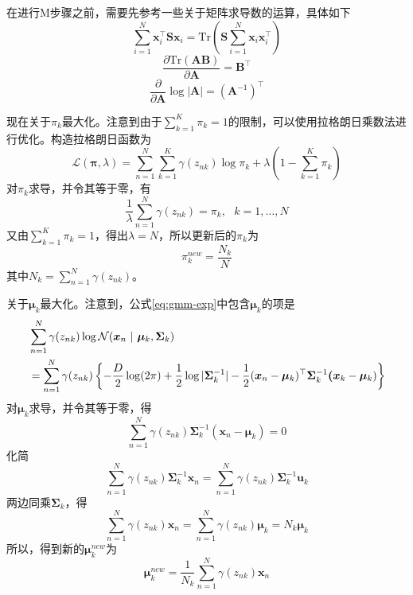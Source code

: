 \documentclass[11pt]{ctexbook}
\begin{document}
在进行M步骤之前，需要先参考一些关于矩阵求导数的运算，具体如下
\begin{equation}
	\sum_{i=1}^N\bm x_i^\top\bm S\bm x_i = \mathrm{Tr}(\bm S\sum_{i=1}^N\bm x_i\bm x_i^\top)
\end{equation}
\begin{equation}
	\frac{\partial\mathrm{Tr}(\bm A\bm B)}{\partial\bm A} = \bm B^\top
\end{equation}
\begin{equation}
	\frac{\partial}{\partial\bm A}\log|\bm A| = (\bm A^{-1})^\top 
\end{equation}

现在关于$\pi_k$最大化。注意到由于$\sum_{k=1}^{K}\pi_k=1$的限制，可以使用拉格朗日乘数法进行优化。构造拉格朗日函数为
\begin{equation}
	\mathcal L(\bm\pi, \lambda) = \sum_{n=1}^N\sum_{k=1}^K\gamma(z_{nk})\log \pi_k+ \lambda(1-\sum_{k=1}^K\pi_k)
\end{equation}
对$\pi_k$求导，并令其等于零，有
\begin{equation}
	\frac{1}{\lambda}\sum_{n=1}^N\gamma(z_{nk}) = \pi_k,\ \ \ k=1, \ldots, N
\end{equation}
又由$\sum_{k=1}^{K}\pi_k=1$，得出$\lambda=N$，所以更新后的$\pi_k$为
\begin{equation}
	\pi_k^{new} = \frac{N_k}{N}
\end{equation}
其中$N_k = \sum_{n=1}^N\gamma(z_{nk})$。

关于$\bm\mu_k$最大化。注意到，公式\ref{eq:gmm-exp}中包含$\bm\mu_k$的项是
\begin{align}
	\label{eq:gmm-33}
	& \sum_{n=1}^{N}\gamma(z_{nk})\log\mathcal N(\bm x_n\ |\ \bm\mu_k, \bm\Sigma_k) \notag \\
	& = \sum_{n=1}^{N}\gamma(z_{nk})\left\{-\frac{D}{2}\log(2\pi) + \frac{1}{2}\log|\bm\Sigma_k^{-1}| -\frac{1}{2} (\bm x_n-\bm \mu_k)^\top\bm\Sigma_k^{-1}\bm(\bm x_k-\bm\mu_k)\right\}
\end{align}
对$\bm\mu_k$求导，并令其等于零，得
\begin{equation}
	\sum_{n=1}^N\gamma(z_{nk})\bm\Sigma_k^{-1}(\bm x_n-\bm\mu_k) = 0
\end{equation}
化简
\begin{equation}
	\sum_{n=1}^N\gamma(z_{nk})\bm\Sigma_k^{-1}\bm x_n  = \sum_{n=1}^N\gamma(z_{nk})\bm\Sigma_k^{-1}\bm u_k
\end{equation}
两边同乘$\bm\Sigma_k$，得
\begin{equation}
	\sum_{n=1}^N\gamma(z_{nk})\bm x_n = \sum_{n=1}^N\gamma(z_{nk})\bm \mu_k = N_k \bm\mu_k
\end{equation}
所以，得到新的$\bm \mu_k^{new}$为
\begin{equation}
	\bm\mu_k^{new} = \frac{1}{N_k}\sum_{n=1}^N\gamma(z_{nk})\bm x_n
\end{equation}
\end{document}
